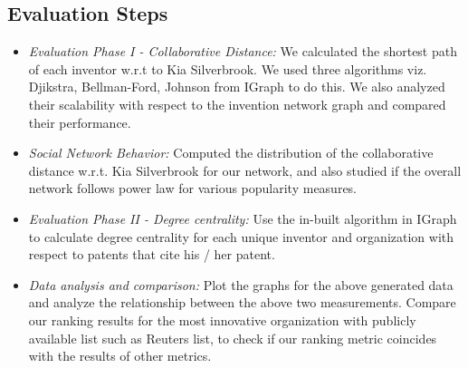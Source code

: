 \subsection{Evaluation Steps}
	\begin{itemize}
		\squish
		\item {\em Evaluation Phase I - Collaborative Distance:} We calculated the 
		shortest path of each inventor w.r.t to Kia Silverbrook. We used three
		algorithms viz. Djikstra, Bellman-Ford, Johnson from IGraph to do this. We
		also analyzed their scalability with respect to the invention network graph
		and compared their performance.
		\item {\em Social Network Behavior:} Computed the distribution of the 
		collaborative distance w.r.t. Kia Silverbrook for our network, and also studied
		if the overall network follows power law for various popularity measures.
		\item {\em Evaluation Phase II - Degree centrality:} Use the in-built
		algorithm in IGraph to calculate degree centrality
		for each unique inventor and organization with respect to patents that cite his / her patent.
		\item {\em Data analysis and comparison:} Plot the graphs for the above
		generated data and analyze the relationship between the above two
		measurements. Compare our ranking results for the most innovative organization
		with publicly available list such as Reuters list, to check if our ranking
		metric coincides with the results of other metrics.
	\end{itemize}



